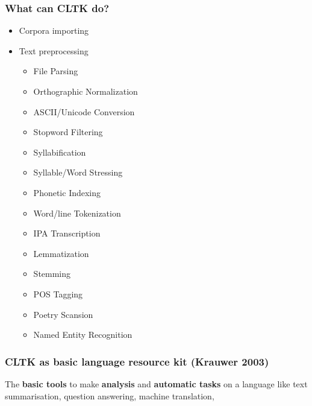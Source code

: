 \documentclass{beamer}
\begin{document}
\begin{frame}
\frametitle{What can CLTK do?}
\begin{itemize}
    \item Corpora importing
    \item Text preprocessing
    \begin{itemize}
        \item File Parsing
        \item Orthographic Normalization
        \item ASCII/Unicode Conversion
        \item Stopword Filtering
        \item Syllabification
        \item Syllable/Word Stressing
        \item Phonetic Indexing
        \item Word/line Tokenization
        \item IPA Transcription
        \item Lemmatization
        \item Stemming
        \item POS Tagging
        \item Poetry Scansion
        \item Named Entity Recognition
    \end{itemize}
\end{itemize}
\end{frame}

\begin{frame}
\frametitle{CLTK as \textbf{b}asic \textbf{la}nguage \textbf{r}esource \textbf{k}it (Krauwer 2003)
}
The \textbf{basic tools} to make \textbf{analysis} and \textbf{automatic tasks} on a language like text summarisation, question answering, machine translation,  


    
\end{frame}



\end{document}
